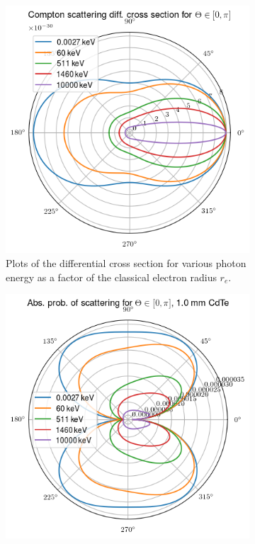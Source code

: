 \documentclass[a4paper,12pt,titlepage, twoside]{article}
\begin{document}
\begin{figure}[ht]
  \centering
  \begin{subfigure}{0.32\textwidth}
    \includegraphics[width=1.0\textwidth]{./fig/klein_nishina_1.png}
    \caption{Plots of the differential cross section for various photon energy as a factor of the classical electron radius $r_e$.}
    \label{fig:klein_1}
  \end{subfigure}
  \begin{subfigure}{0.32\textwidth}
    \includegraphics[width=1.0\textwidth]{./fig/klein_nishina_2.png}

\end{subfigure}
\end{figure}
\end{document}
